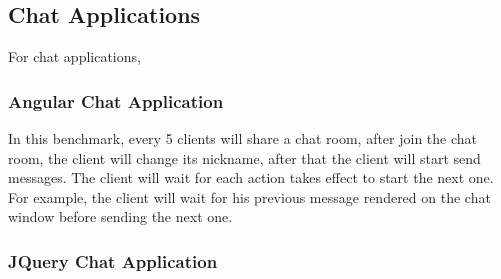 \clickthroughput{}
\clicklatency{}

\clickwaitthroughput{}
\clickwaitlatency{}

\subsection{Chat Applications}
For chat applications, 


\subsubsection{Angular Chat Application}
In this benchmark,
every 5 clients will share a chat room, 
after join the chat room, the client will change its nickname,
after that the client will start send messages.
The client will wait for each action takes effect to start the next one.
For example, the client will wait for his previous message rendered on the chat window before
sending the next one.

\angularchatlatency{}

\subsubsection{JQuery Chat Application}

\jquerychatlatency{}
